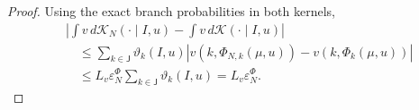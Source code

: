 \documentclass[10pt,a4paper]{amsart}
\begin{document}
\begin{proof}
	Using the exact branch probabilities in both kernels,
	\[
	\begin{aligned}
		&\left|
		\int v\,d\mathcal K_N(\cdot\mid I,u)
		-
		\int v\,d\mathcal K(\cdot\mid I,u)
		\right|
		\\
		&\quad\leq
		\sum_{k\in\mathsf J}
		\vartheta_k(I,u)
		\left|
		v(k,\Phi_{N,k}(\mu,u))
		-
		v(k,\Phi_k(\mu,u))
		\right|
		\\
		&\quad\leq
		L_v\varepsilon_N^{\Phi}
		\sum_{k\in\mathsf J}\vartheta_k(I,u)
		=
		L_v\varepsilon_N^{\Phi}.
	\end{aligned}
	\]
\end{proof}
\end{document}
